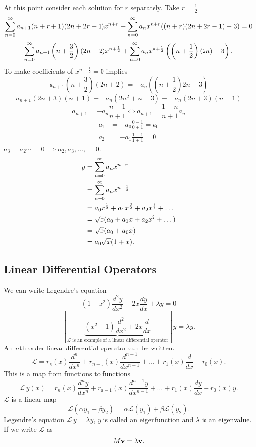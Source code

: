 \documentclass[10pt, a4paper]{article}
\begin{document}
\begin{example}
    At this point consider each solution for $r$ separately.
    Take $r = \frac{1}{2}$
    \[
    \infsum[n = 0]a_{n + 1}(n + r + 1)(2n + 2r + 1)x ^ {n + r} + \infsum[n = 0]a_nx ^ {n + r}((n + r)(2n + 2r - 1) - 3) = 0
    \]
    \[
    \infsum[n = 0]a_{n + 1}\left(n + \frac{3}{2}\right)(2n + 2)x ^ {n + \frac{1}{2}} + \infsum[n = 0]a_nx ^ {n + \frac{1}{2}}\left(\left(n + \frac{1}{2}\right)(2n) - 3\right).
    \]
    To make coefficients of $x ^ {n + \frac{1}{2}} = 0$ implies
    \[
    a_{n + 1}\left(n + \frac{3}{2}\right)(2n + 2) = -a_n\left(\left(n + \frac{1}{2}\right)2n - 3\right)
    \]
    \[
    a_{n + 1}(2n + 3)(n + 1) = -a_n(2n ^ 2 + n - 3) = -a_n(2n + 3)(n - 1)
    \]
    \[
    a_{n + 1} = -a_n\frac{n - 1}{n + 1} \iff a_{n + 1} = \frac{1 - n}{n + 1}a_n
    \]
    \begin{align*}
        a_1 &= -a_0\frac{0 - 1}{0 + 1} = a_0 \\
        a_2 &= -a_1\frac{1 - 1}{1 + 1} = 0
    \end{align*}
    $a_3 = a_2\dotsi = 0 \implies a_2, a_3, \dotsc, = 0$.
    \begin{align*}
        y &= \infsum[n = 0]a_nx ^ {n + r} \\
        &= \infsum[n = 0]a_nx ^ {n + \frac{1}{2}} \\
        &= a_0x ^ {\frac{1}{2}} + a_1x ^ {\frac{3}{2}} + a_2x ^ {\frac{5}{2}} + \dotsc \\
        &= \sqrt{x}(a_0 + a_1x + a_2x ^ 2 + \dotsc) \\
        &= \sqrt{x}(a_0 + a_0x) \\
        &= a_0\sqrt{x}(1 + x).
    \end{align*}
\end{example}

\subsection{Linear Differential Operators}
We can write Legendre's equation
\[
(1 - x ^ 2)\frac{d ^ 2y}{dx ^ 2} - 2x\frac{dy}{dx} + \lambda y = 0
\]
\[
\left[\underbrace{(x ^ 2 - 1)\frac{d ^ 2}{dx ^ 2} + 2x\frac{d}{dx}}_{\mathcal{L}\text{ is an example of a linear differential operator}}\right]y = \lambda y.
\]
An $n$th order linear differential operator can be written.
\[
\mathcal{L} = r_n(x)\frac{d ^ n}{dx ^ n} + r_{n - 1}(x)\frac{d ^ {n - 1}}{dx ^ {n - 1}} + \dotsc + r_1(x)\frac{d}{dx} + r_0(x).
\]
This is a map from functions to functions
\[
\mathcal{L}\,y(x) = r_n(x)\frac{d ^ ny}{dx ^ n} + r_{n - 1}(x)\frac{d ^ {n - 1}y}{dx ^ {n - 1}} + \dotsc + r_1(x)\frac{dy}{dx} + r_0(x)y.
\]
$\mathcal{L}$ is a linear map
\[
\mathcal{L}(\alpha y_1 + \beta y_2) = \alpha\mathcal{L}(y_1) + \beta\mathcal{L}(y_2).
\]
Legendre's equation $\mathcal{L}\,y = \lambda y$,
$y$ is called an eigenfunction and $\lambda$ is an eigenvalue.
If we write $\mathcal{L}$ as
\[
M\mbf{v} = \lambda\mbf{v}.
\]
\end{document}
